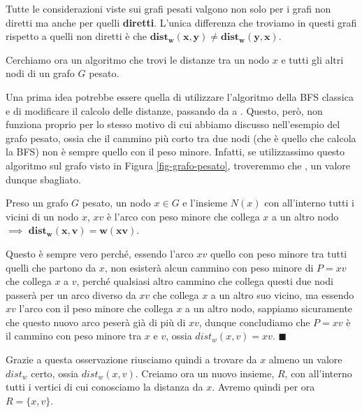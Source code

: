 \documentclass[11pt, a4paper, titlepage, oneside]{scrbook}
\begin{document}
\begin{Proposizione}
\label{propos-grafio-pesati-diretti}
Tutte le considerazioni viste sui grafi pesati valgono non solo per i grafi non diretti ma anche per quelli \textbf{diretti}. L'unica differenza che troviamo in questi grafi rispetto a quelli non diretti è che $\bm{dist_w(x,y) \neq dist_w(y,x)}$.
\end{Proposizione}

Cerchiamo ora un algoritmo che trovi le distanze tra un nodo $x$ e tutti gli altri nodi di un grafo $G$ pesato.

Una prima idea potrebbe essere quella di utilizzare l'algoritmo della BFS classica e di modificare il calcolo delle distanze, passando da  a . Questo, però, non funziona proprio per lo stesso motivo di cui abbiamo discusso nell'esempio del grafo pesato, ossia che il cammino più corto tra due nodi (che è quello che calcola la BFS) non è sempre quello con il peso minore. Infatti, se utilizzassimo questo algoritmo sul grafo visto in Figura \ref{fig-grafo-pesato}, troveremmo che , un valore dunque sbagliato.

\begin{Osservazione}[]
\label{oss-grafi-pesati-vicini}
Preso un grafo $G$ pesato, un nodo $x \in G$ e l'insieme $N(x)$ con all'interno tutti i vicini di un nodo $x$, $xv$ è l'arco con peso minore che collega $x$ a un altro nodo $\implies$ $\bm{dist_w(x,v) = w(xv)}$. 
\end{Osservazione}

\Dimostrazione \nopagebreak

Questo è sempre vero perché, essendo l'arco $xv$ quello con peso minore tra tutti quelli che partono da $x$, non esisterà alcun cammino con peso minore di $P = xv$ che collega $x$ a $v$, perché qualsiasi altro cammino che collega questi due nodi passerà per un arco diverso da $xv$ che collega $x$ a un altro suo vicino, ma essendo $xv$ l'arco con il peso minore che collega $x$ a un altro nodo, sappiamo sicuramente che questo nuovo arco peserà già di più di $xv$, dunque concludiamo che $P = xv$ è il cammino con peso minore tra $x$ e $v$, ossia $dist_w(x,v) = xv$. $\blacksquare$

Grazie a questa osservazione riusciamo quindi a trovare da $x$ almeno un valore $dist_w$ certo, ossia $dist_w(x,v)$. Creiamo ora un nuovo insieme, $R$, con all'interno tutti i vertici di cui conosciamo la distanza da $x$. Avremo quindi per ora $R = \{x,v\}$. 
\end{document}
